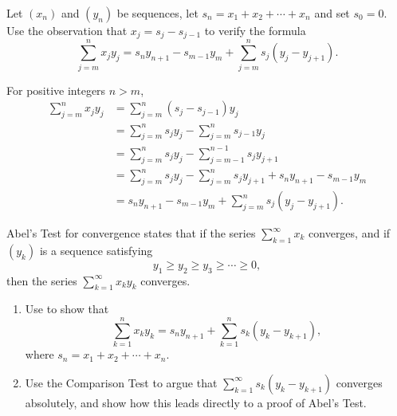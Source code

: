 \documentclass{lew98_solutions}
\begin{document}
\begin{exercise}
\label{ex:2.7.12}
    Let \( (x_n) \) and \( (y_n) \) be sequences, let \( s_n = x_1 + x_2 + \cdots + x_n \) and set \( s_0 = 0 \). Use the observation that \( x_j = s_j - s_{j-1} \) to verify the formula
    \[
        \sum_{j=m}^n x_j y_j = s_n y_{n+1} - s_{m-1} y_m + \sum_{j=m}^n s_j (y_j - y_{j+1}).
    \]
\end{exercise}

\begin{solution}
    For positive integers \( n > m \),
    \begin{align*}
        \sum_{j=m}^n x_j y_j &= \sum_{j=m}^n (s_j - s_{j-1}) y_j \\
        &= \sum_{j=m}^n s_j y_j - \sum_{j=m}^n s_{j-1} y_j \\
        &= \sum_{j=m}^n s_j y_j - \sum_{j=m-1}^{n-1} s_j y_{j+1} \\
        &= \sum_{j=m}^n s_j y_j - \sum_{j=m}^n s_j y_{j+1} + s_n y_{n+1} - s_{m-1} y_m \\
        &= s_n y_{n+1} - s_{m-1} y_m + \sum_{j=m}^n s_j (y_j - y_{j+1}).
    \end{align*}
\end{solution}

\begin{exercise}
\label{ex:2.7.13}
    Abel's Test for convergence states that if the series \( \sum_{k=1}^{\infty} x_k \) converges, and if \( (y_k) \) is a sequence satisfying
    \[
        y_1 \geq y_2 \geq y_3 \geq \cdots \geq 0,
    \]
    then the series \( \sum_{k=1}^{\infty} x_k y_k \) converges.
    \begin{enumerate}
        \item Use  to show that
        \[
            \sum_{k=1}^n x_k y_k = s_n y_{n+1} + \sum_{k=1}^n s_k (y_k - y_{k+1}),
        \]
        where \( s_n = x_1 + x_2 + \cdots + x_n \).

        \item Use the Comparison Test to argue that \( \sum_{k=1}^{\infty} s_k (y_k - y_{k+1}) \) converges absolutely, and show how this leads directly to a proof of Abel's Test.
    \end{enumerate}
\end{exercise}
\end{document}
